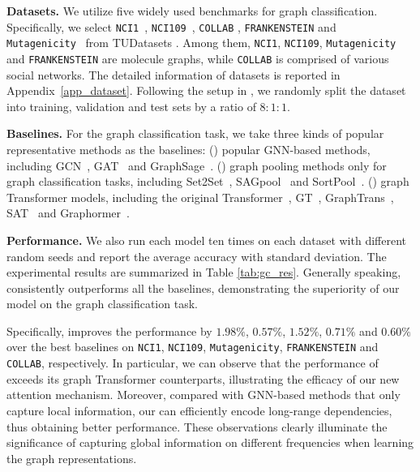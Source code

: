 \documentclass[sigconf, screen]{acmart}
\begin{document}
\textbf{Datasets.} 
We utilize five widely used benchmarks for graph classification.
Specifically, we select \texttt{NCI1}~\cite{nci}, \texttt{NCI109}~\cite{nci}, \texttt{COLLAB} \cite{collab}, \texttt{FRANKENSTEIN} \cite{frank} and \texttt{Mutagenicity}~\cite{mutag} from TUDatasets \cite{tudataset}. 
Among them, \texttt{NCI1}, \texttt{NCI109}, \texttt{Mutagenicity} and \texttt{FRANKENSTEIN} are molecule graphs, while \texttt{COLLAB} is comprised of various social networks.
The detailed information of datasets is reported in Appendix~\ref{app_dataset}.
Following the setup in \cite{nci, graphtrans}, we randomly split the dataset into training, validation and test sets by a ratio of $8:1:1$.

\textbf{Baselines.}
For the graph classification task, we take three kinds of popular representative methods as the baselines: (\uppercase\expandafter{})
popular GNN-based methods, including GCN~\cite{gcn}, GAT~\cite{gat} and GraphSage~\cite{graphsage}. 
(\uppercase\expandafter{}) graph pooling methods only for graph classification tasks, including Set2Set~\cite{set2set}, SAGpool~\cite{sagpool} and SortPool~\cite{sortpool}.
(\uppercase\expandafter{}) graph Transformer models, including the original Transformer~\cite{transformer}, GT~\cite{gt}, GraphTrans~\cite{graphtrans},  SAT~\cite{sat} and Graphormer~\cite{graphormer}. 

\textbf{Performance.} 
We also run each model ten times on each dataset with different random seeds and report the average accuracy with standard deviation. 
The experimental results are summarized in Table \ref{tab:gc_res}. 
Generally speaking, \name consistently outperforms all the baselines, demonstrating the superiority of our model on the graph classification task.

Specifically, \name improves the performance by $1.98\%$, $0.57\%$, $1.52\%$, $0.71\%$ and $0.60\%$ over the best baselines on \texttt{NCI1}, \texttt{NCI109}, \texttt{Mutagenicity}, \texttt{FRANKENSTEIN} and \texttt{COLLAB}, respectively. 
In particular, we can observe that the performance of \name exceeds its graph Transformer counterparts, illustrating the efficacy of our new attention mechanism. 
Moreover, compared with GNN-based methods that only capture local information, our \name can efficiently encode long-range dependencies, thus obtaining better performance. 
These observations clearly illuminate the significance of capturing global information on different frequencies when learning the graph representations.
\end{document}
